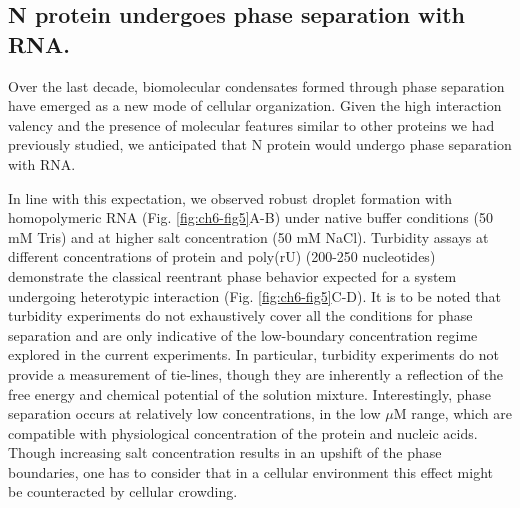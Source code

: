 \documentclass[../main.tex]{subfiles}
\begin{document}
\begin{figure}[!htb]
            \label{fig:ch6-fig4}
        \end{figure}

    \subsection{N protein undergoes phase separation with RNA.}
        Over the last decade, biomolecular condensates formed through phase separation have emerged as a new mode of cellular organization\cite{Banani2017-iu,Shin2017-as,Brangwynne2009-xn,Li2012-dd}. Given the high interaction valency and the presence of molecular features similar to other proteins we had previously studied, we anticipated that N protein would undergo phase separation with RNA\cite{Martin2020-yc,Guillen-Boixet2020-sn,Wang:2018dl}. 

        In line with this expectation, we observed robust droplet formation with homopolymeric RNA (Fig. \ref{fig:ch6-fig5}A-B) under native buffer conditions (50 mM Tris) and at higher salt concentration (50 mM NaCl). Turbidity assays at different concentrations of protein and poly(rU) (200-250 nucleotides) demonstrate the classical reentrant phase behavior expected for a system undergoing heterotypic interaction (Fig. \ref{fig:ch6-fig5}C-D). It is to be noted that turbidity experiments do not exhaustively cover all the conditions for phase separation and are only indicative of the low-boundary concentration regime explored in the current experiments. In particular, turbidity experiments do not provide a measurement of tie-lines, though they are inherently a reflection of the free energy and chemical potential of the solution mixture\cite{Stockmayer1950-ad}. Interestingly, phase separation occurs at relatively low concentrations, in the low $\mu$M range, which are compatible with physiological concentration of the protein and nucleic acids. Though increasing salt concentration results in an upshift of the phase boundaries, one has to consider that in a cellular environment this effect might be counteracted by cellular crowding. 
\end{document}

